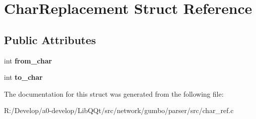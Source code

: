 \hypertarget{struct_char_replacement}{}\section{Char\+Replacement Struct Reference}
\label{struct_char_replacement}
\subsection*{Public Attributes}
\begin{DoxyCompactItemize}
\item 
\mbox{\label{struct_char_replacement_a90457c80c11afac1f21fa14216585914}} 
int {\bfseries from\+\_\+char}
\item 
\mbox{\label{struct_char_replacement_a2fb8b4ef28d08b1aad6f51c901697f41}} 
int {\bfseries to\+\_\+char}
\end{DoxyCompactItemize}


The documentation for this struct was generated from the following file\+:\begin{DoxyCompactItemize}
\item 
R\+:/\+Develop/a0-\/develop/\+Lib\+Q\+Qt/src/network/gumbo/parser/src/char\+\_\+ref.\+c\end{DoxyCompactItemize}
